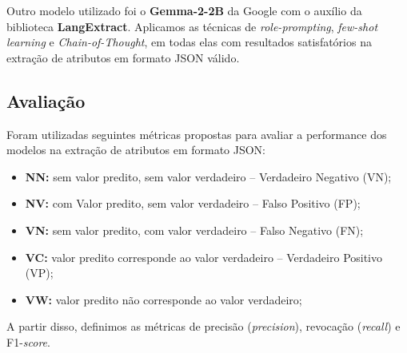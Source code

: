 Outro modelo utilizado foi o \textbf{Gemma-2-2B} da Google com o auxílio da biblioteca \textbf{LangExtract}. Aplicamos as técnicas de \textit{role-prompting}, \textit{few-shot learning} e \textit{Chain-of-Thought}, em todas elas com resultados satisfatórios na extração de atributos em formato JSON válido.

\subsection{Avaliação}

Foram utilizadas seguintes métricas propostas \cite{ExtractGPT2023, PAE2024, MAVE2024} para avaliar a performance dos modelos na extração de atributos em formato JSON:

\begin{itemize}
  \item \textbf{NN:} sem valor predito, sem valor verdadeiro -- Verdadeiro Negativo (VN);
  \item \textbf{NV:} com Valor predito, sem valor verdadeiro -- Falso Positivo (FP);
  \item \textbf{VN:} sem valor predito, com valor verdadeiro -- Falso Negativo (FN);
  \item \textbf{VC:} valor predito corresponde ao valor verdadeiro -- Verdadeiro Positivo (VP);
  \item \textbf{VW:} valor predito não corresponde ao valor verdadeiro;

\end{itemize}

A partir disso, definimos as métricas de precisão (\textit{precision}), revocação (\textit{recall}) e F1-\textit{score}.


